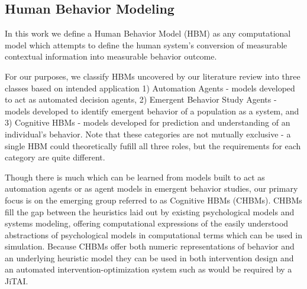 \documentclass[conference]{IEEEtran}
\begin{document}
\subsection{Human Behavior Modeling}
In this work we define a Human Behavior Model (HBM) as any computational model which attempts to define the human system's conversion of measurable contextual information into measurable behavior outcome. 

For our purposes, we classify HBMs uncovered by our literature review into three classes based on intended application 1) Automation Agents\cite{wooldridge1995agent} - models developed to act as automated decision agents, 2) Emergent Behavior Study Agents\cite{li2006survey} - models developed to identify emergent behavior of a population as a system, and 3) Cognitive HBMs - models developed for prediction and understanding of an individual's behavior.
Note that these categories are not mutually exclusive - a single HBM could theoretically fufill all three roles, but the requirements for each category are quite different.

Though there is much which can be learned from models built to act as automation agents or as agent models in emergent behavior studies, our primary focus is on the emerging group referred to as Cognitive HBMs (CHBMs).
CHBMs fill the gap between the heuristics laid out by existing psychological models and systems modeling, offering computational expressions of the easily understood abstractions of psychological models in computational terms which can be used in simulation. 
Because CHBMs offer both numeric representations of behavior and an underlying heuristic model they can be used in both intervention design and an automated intervention-optimization system such as would be required by a JiTAI\cite{hekler2013}.
\end{document}
